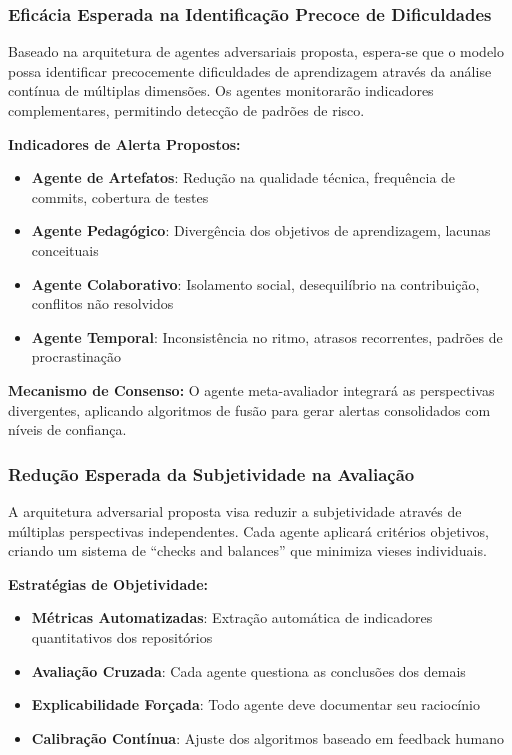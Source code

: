 \documentclass[english, spanish, brazilian]{modelo_dt}
\begin{document}
\subsubsection{Eficácia Esperada na Identificação Precoce de Dificuldades}

Baseado na arquitetura de agentes adversariais proposta, espera-se que o modelo possa identificar precocemente dificuldades de aprendizagem através da análise contínua de múltiplas dimensões\@. Os agentes monitorarão indicadores complementares, permitindo detecção de padrões de risco\@.

\textbf{Indicadores de Alerta Propostos:}
\begin{itemize}
\item \textbf{Agente de Artefatos}: Redução na qualidade técnica, frequência de commits, cobertura de testes
\item \textbf{Agente Pedagógico}: Divergência dos objetivos de aprendizagem, lacunas conceituais
\item \textbf{Agente Colaborativo}: Isolamento social, desequilíbrio na contribuição, conflitos não resolvidos
\item \textbf{Agente Temporal}: Inconsistência no ritmo, atrasos recorrentes, padrões de procrastinação
\end{itemize}

\textbf{Mecanismo de Consenso:}
O agente meta-avaliador integrará as perspectivas divergentes, aplicando algoritmos de fusão para gerar alertas consolidados com níveis de confiança\@.

\subsubsection{Redução Esperada da Subjetividade na Avaliação}

A arquitetura adversarial proposta visa reduzir a subjetividade através de múltiplas perspectivas independentes\@. Cada agente aplicará critérios objetivos, criando um sistema de ``checks and balances'' que minimiza vieses individuais\@.

\textbf{Estratégias de Objetividade:}
\begin{itemize}
\item \textbf{Métricas Automatizadas}: Extração automática de indicadores quantitativos dos repositórios
\item \textbf{Avaliação Cruzada}: Cada agente questiona as conclusões dos demais
\item \textbf{Explicabilidade Forçada}: Todo agente deve documentar seu raciocínio
\item \textbf{Calibração Contínua}: Ajuste dos algoritmos baseado em feedback humano
\end{itemize}
\end{document}
